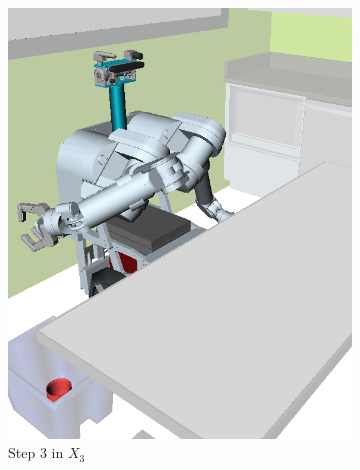 {\begin{figure}
\begin{widepage}
\begin{center}
\begin{subfigure}[t]{0.19\linewidth}
\includegraphics[width=\columnwidth]{figs/testherb-d.png}
\caption{Step 3 in $X_3$}
\end{subfigure}
\begin{subfigure}[t]{0.19\linewidth}
\centering

\end{subfigure}
\end{center}
\end{widepage}
\end{figure}}
